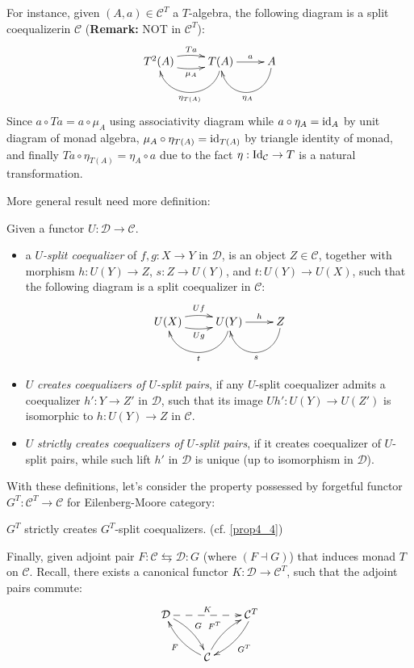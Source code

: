 \documentclass{article}
\begin{document}
For instance, given $(A,a)\in \mathcal{C}^T$ a $T$-algebra, the following diagram is a split coequalizerin $\mathcal{C}$ (\textbf{Remark:} NOT in $\mathcal{C}^T$):
\[\xymatrix{
    T^2(A) \ar@/_{-.5pc}/[r]^-{Ta} \ar@/_{.5pc}/[r]_-{\mu_A} & T(A) \ar@(d,d)[l]^-{\eta_{T(A)}} \ar[r]^-{a} & A \ar@(d,d)[l]^-{\eta_A}
}\]
Since $a\circ Ta = a\circ \mu_A$ using associativity diagram while $a\circ \eta_A = \mathrm{id}_A$ by unit diagram of monad algebra, $\mu_A\circ \eta_{T(A)}=\mathrm{id}_{T(A)}$ by triangle identity of monad, and finally $Ta \circ \eta_{T(A)}=\eta_A\circ a$ due to the fact $\eta:\mathrm{Id}_\mathcal{C}\rightarrow T$ is a natural transformation.

\hfil

More general result need more definition:
\begin{defn}
    Given a functor $U:\mathcal{D}\rightarrow\mathcal{C}$.
    \begin{itemize}
        \item a \emph{$U$-split coequalizer} of $f,g:X\rightarrow Y$ in $\mathcal{D}$, is an object $Z\in\mathcal{C}$, together with morphism $h:U(Y)\rightarrow Z$, $s:Z\rightarrow U(Y)$, and $t:U(Y)\rightarrow U(X)$, such that the following diagram is a split coequalizer in $\mathcal{C}$:
        \[\xymatrix{
            U(X) \ar@/_{-.5pc}/[r]^-{Uf} \ar@/_{.5pc}/[r]_-{Ug} & U(Y) \ar@(d,d)[l]^-{t} \ar[r]^-{h} & Z \ar@(d,d)[l]^-{s}
        }\]
        \item $U$ \emph{creates coequalizers of $U$-split pairs}, if any $U$-split coequalizer admits a coequalizer $h':Y\rightarrow Z'$ in $\mathcal{D}$, such that its image $Uh':U(Y)\rightarrow U(Z')$ is isomorphic to $h:U(Y)\rightarrow Z$ in $\mathcal{C}$.
        \item $U$ \emph{strictly creates coequalizers of $U$-split pairs}, if it creates coequalizer of $U$-split pairs, while such lift $h'$ in $\mathcal{D}$ is unique (up to isomorphism in $\mathcal{D}$).
    \end{itemize}
\end{defn}

With these definitions, let's consider the property possessed by forgetful functor $G^T:\mathcal{C}^T\rightarrow\mathcal{C}$ for Eilenberg-Moore category:
\begin{prop}
    $G^T$ strictly creates $G^T$-split coequalizers. (cf. \ref{prop4_4})
\end{prop}

\hfil

Finally, given adjoint pair $F:\mathcal{C}\leftrightarrows\mathcal{D}:G$ (where $(F\dashv G)$) that induces monad $T$ on $\mathcal{C}$. Recall, there exists a canonical functor $K:\mathcal{D}\rightarrow \mathcal{C}^T$, such that the adjoint pairs commute:
\[\xymatrix{
    \mathcal{D} \ar@/_{-.5pc}/[dr]^-{G} \ar@{-->}[rr]^-{K} && \mathcal{C}^T \ar@/_{-.5pc}/[dl]^-{G^T}\\
    & \mathcal{C} \ar@/_{-.5pc}/[ul]^-{F} \ar@/_{-.5pc}/[ur]^-{F^T}
}\]
\end{document}
